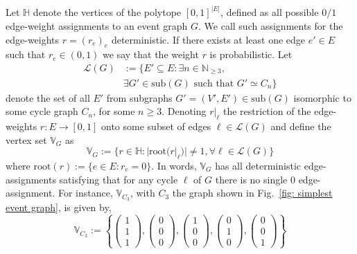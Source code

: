 \documentclass[letterpaper,onecolumn,12pt,accepted=2024-01-17]{article}
\begin{document}
{
Let $\mathbb{H}$ denote the vertices of the polytope $[0,1]^{|E|}$, defined as all possible $0/1$ edge-weight assignments to an event graph $G$. We call such assignments for the edge-weights $r = (r_e)_e$ deterministic. If there exists at least one edge $e' \in E$ such that $r_e \in (0,1)$ we say that the weight $r$ is probabilistic. Let \begin{align*}
\mathcal{L}(G) &:= \{ E' \subseteq E : \exists n \in \mathbb{N}_{\geq 3},\\&\exists G' \in \text{sub}(G) \text{ such that } G' \simeq C_n\}
\end{align*}denote the set of all $E'$ from subgraphs $G'=(V',E') \in \text{sub}(G)$  isomorphic to some cycle graph $C_n$, for some $n\geq 3$. Denoting $r\vert_{\ell}$ the restriction of the edge-weights $r: E \to [0,1]$ onto some subset of edges $\ell \in \mathcal{L}(G)$ and define the vertex set $\mathbb{V}_G$ as
\begin{equation}
    \mathbb{V}_G := \{r \in \mathbb{H}: |\text{root}(r|_{\ell})| \neq 1, \forall \ell \in \mathcal{L}(G)\}
\end{equation} 
where $\text{root}(r) := \{e \in E: r_e = 0\}$. In words, $\mathbb{V}_G$ has all deterministic edge-assignments satisfying that for any cycle $\ell$ of $G$ there is no single $0$ edge-assignment. For instance, $\mathbb{V}_{C_3}$, with $C_3$ the graph shown in Fig.~\ref{fig: simplest event graph},  is given by,
\begin{equation*}
    \mathbb{V}_{C_3}:=\left\{ \left(\begin{matrix}1\\1\\1\end{matrix}\right), \left(\begin{matrix}0\\0\\0\end{matrix}\right), \left(\begin{matrix}1\\0\\0\end{matrix}\right),\left(\begin{matrix}0\\1\\0\end{matrix}\right), \left(\begin{matrix}0\\0\\1\end{matrix}\right) \right\}

\end{equation*}}
\end{document}
